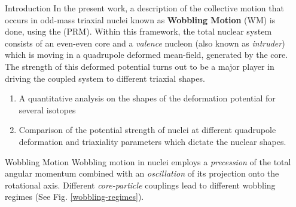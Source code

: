 \documentclass[final]{beamer}
\newlength{\sepwidth}
\newlength{\colwidth}
\newcommand{\separatorcolumn}{\begin{column}{\sepwidth}\end{column}}
\begin{document}
\begin{frame}[t]
\begin{columns}[t]
\separatorcolumn
\begin{column}{\colwidth}
  \begin{block}{Introduction}
In the present work, a description of the collective motion that occurs in odd-mass triaxial nuclei known as \textbf{Wobbling Motion} (WM) is done, using the  (PRM). Within this framework, the total nuclear system consists of an even-even core and a \emph{valence} nucleon (also known as \emph{intruder}) which is moving in a quadrupole deformed mean-field, generated by the core. The strength of this deformed potential turns out to be a major player in driving the coupled system to different triaxial shapes.
\begin{enumerate}
    \item A quantitative analysis on the shapes of the deformation potential for several isotopes
    \item Comparison of the potential strength of nuclei at different quadrupole deformation and triaxiality parameters which dictate the nuclear shapes.
\end{enumerate}
  \end{block}
\begin{block}{Wobbling Motion}
  Wobbling motion in nuclei employs a \emph{precession} of the total angular momentum combined with an \emph{oscillation} of its projection onto the rotational axis. Different \emph{core-particle} couplings lead to different wobbling regimes (See Fig. \ref{wobbling-regimes}).

\end{block}
\end{column}
\end{columns}
\end{frame}
\end{document}
